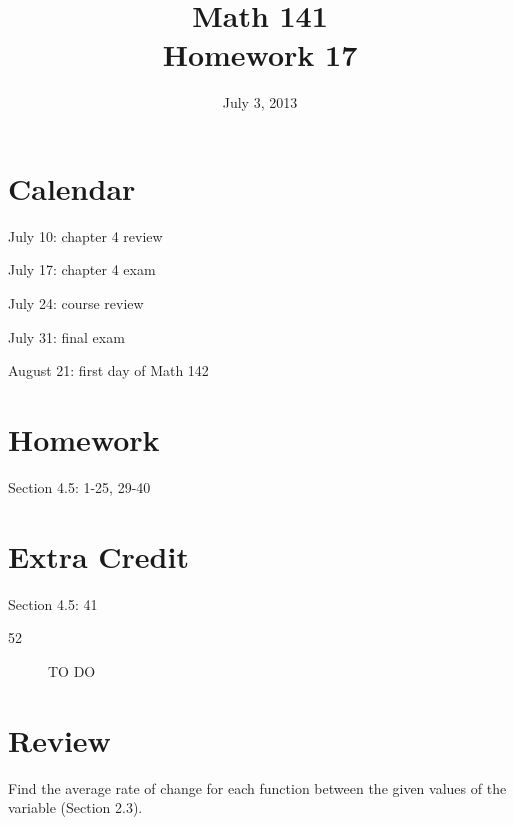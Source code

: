 \documentclass{exam}
\date{July 3, 2013}
\author{}
\title{Math 141 \\ Homework 17}
\begin{document}
    \maketitle

    \section{Calendar}
    \begin{itemize*}
      \item July 10: chapter 4 review
      \item July 17: chapter 4 exam
      \item July 24: course review
      \item July 31: final exam
      \item August 21: first day of Math 142 
    \end{itemize*}

    \section{Homework}
    Section 4.5: 1-25, 29-40 

    \section{Extra Credit}
    Section 4.5: 41

    \ifprintanswers
      \begin{description}
        \item[52] TO DO
      \end{description}
    \fi

    \section{Review}

    Find the average rate of change for each function between the given values of the variable (Section 2.3).
\end{document}
